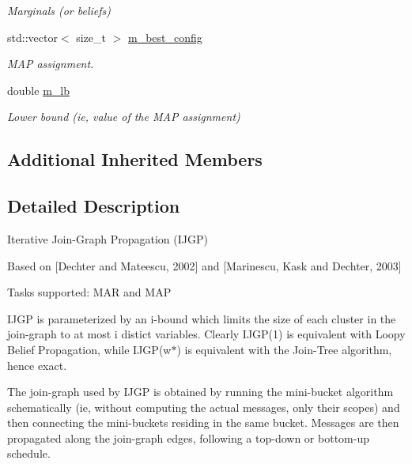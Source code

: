\begin{DoxyCompactItemize}
\begin{DoxyCompactList}\small\item\em Marginals (or beliefs) \end{DoxyCompactList}\item 
std\+::vector$<$ size\+\_\+t $>$ \hyperlink{classmerlin_1_1ijgp_a6f00b802c54c7d225001577edb51bbc8}{m\+\_\+best\+\_\+config}\hypertarget{classmerlin_1_1ijgp_a6f00b802c54c7d225001577edb51bbc8}{}\label{classmerlin_1_1ijgp_a6f00b802c54c7d225001577edb51bbc8}

\begin{DoxyCompactList}\small\item\em M\+AP assignment. \end{DoxyCompactList}\item 
double \hyperlink{classmerlin_1_1ijgp_a5665048f86025d11b0c4fe40eeb4ddfb}{m\+\_\+lb}\hypertarget{classmerlin_1_1ijgp_a5665048f86025d11b0c4fe40eeb4ddfb}{}\label{classmerlin_1_1ijgp_a5665048f86025d11b0c4fe40eeb4ddfb}

\begin{DoxyCompactList}\small\item\em Lower bound (ie, value of the M\+AP assignment) \end{DoxyCompactList}\end{DoxyCompactItemize}
\subsection*{Additional Inherited Members}


\subsection{Detailed Description}
Iterative Join-\/\+Graph Propagation (I\+J\+GP)

Based on \mbox{[}Dechter and Mateescu, 2002\mbox{]} and \mbox{[}Marinescu, Kask and Dechter, 2003\mbox{]}

Tasks supported\+: M\+AR and M\+AP

I\+J\+GP is parameterized by an i-\/bound which limits the size of each cluster in the join-\/graph to at most i distict variables. Clearly I\+J\+G\+P(1) is equivalent with Loopy Belief Propagation, while I\+J\+G\+P(w$\ast$) is equivalent with the Join-\/\+Tree algorithm, hence exact.

The join-\/graph used by I\+J\+GP is obtained by running the mini-\/bucket algorithm schematically (ie, without computing the actual messages, only their scopes) and then connecting the mini-\/buckets residing in the same bucket. Messages are then propagated along the join-\/graph edges, following a top-\/down or bottom-\/up schedule.


